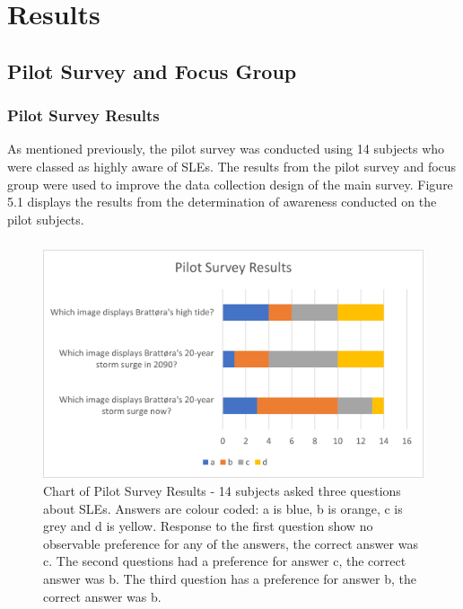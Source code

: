 \chapter{Results}

\section{Pilot Survey and Focus Group}

\subsection{Pilot Survey Results}
As mentioned previously, the pilot survey was conducted using 14 subjects who were classed as highly aware of SLEs. The results from the pilot survey and focus group were used to improve the data collection design of the main survey. Figure 5.1 displays the results from the determination of awareness conducted on the pilot subjects.
\paragraph{}

\begin{figure}[H]
    \centering
    \includegraphics{fig_results/pilot-survey-results.png}
    \caption{Chart of Pilot Survey Results - 14 subjects asked three questions about SLEs. Answers are colour coded: a is blue, b is orange, c is grey and d is yellow. Response to the first question show no observable preference for any of the answers, the correct answer was c. The second questions had a preference for answer c, the correct answer was b. The third question has a preference for answer b, the correct answer was b.}
    \label{fig:pilot_survey_results}
\end{figure}

